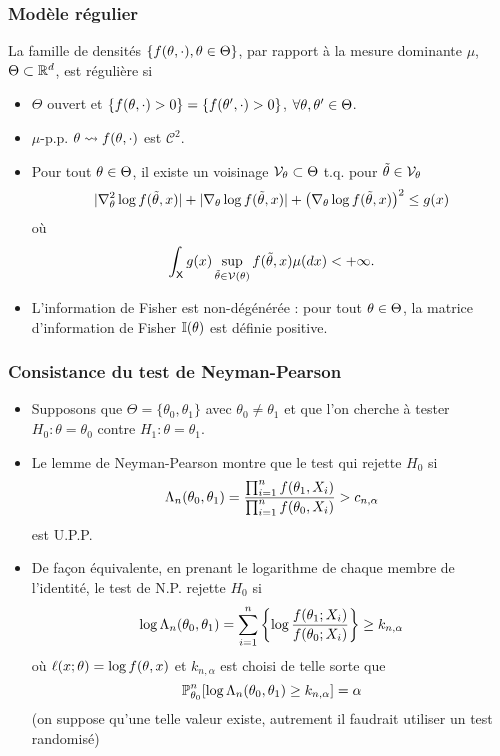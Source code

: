 \begin{frame}
\frametitle{Modèle régulier}
\begin{df} La famille de densités $\{f(\theta,\cdot),\theta \in \Theta\}$,  par rapport à la mesure dominante $\mu$, $\Theta \subset \mathbb{R}^d$, est \alert{régulière} si
\begin{itemize}
\item $\Theta$ ouvert et $\{f(\theta, \cdot)>0\}=\{f(\theta', \cdot)>0\}$, $\forall \theta, \theta' \in \Theta$.
\item $\mu$-p.p. $\theta \leadsto f(\theta,\cdot)$ est ${\mathcal C}^2$.
 \item Pour tout $\theta \in \Theta$, il existe un voisinage ${\mathcal V}_\theta \subset \Theta$ t.q. pour $\tilde{\theta} \in {\mathcal V}_\theta$
$$|\nabla_\theta^{2}\log f(\tilde{\theta},x)|+|\nabla_\theta \log f(\tilde{\theta},x)|+\big(\nabla_\theta\log f(\tilde{\theta},x)\big)^2\leq g(x)$$
où
$$\int_{\mathsf{X}}g(x)\sup_{\tilde{\theta} \in {\mathcal V}(\theta)}f(\tilde{\theta},x)\mu(dx)<+\infty.$$
\item L'information de Fisher est non-dégénérée : pour tout $\theta \in \Theta$, la matrice d'information de Fisher
$\mathbb{I}(\theta)$ est définie positive.
\end{itemize}
\end{df}
\end{frame}

\begin{frame}
\frametitle{Consistance du test de Neyman-Pearson}
\begin{itemize}
\item Supposons que $\Theta= \{\theta_0,\theta_1\}$ avec $\theta_0 \ne \theta_1$ et que l'on cherche à tester $H_0: \theta = \theta_0$ contre $H_1: \theta= \theta_1$.
\item Le lemme de Neyman-Pearson montre que le test qui rejette $H_0$ si
\[
\Lambda_n(\theta_0,\theta_1) = \frac{\prod_{i=1}^n f(\theta_1,X_i)}{\prod_{i=1}^{n} f(\theta_0,X_i)} > c_{n,\alpha}
\]
est U.P.P.
\item De façon équivalente, en prenant le logarithme de chaque membre de l'identité, le test de N.P. rejette $H_0$ si
\[
\log \Lambda_n(\theta_0,\theta_1)  = \sum_{i=1}^n \left\{ \log \frac{f(\theta_1;X_i)}{f(\theta_0;X_i)} \right\} \geq k_{n,\alpha}
\]
où $\ell(x;\theta)= \log f(\theta,x)$ et $k_{n,\alpha}$ est choisi de telle sorte que
\[
\operatorname{{\mathbb P}}_{\theta_0}^n [ \log \Lambda_n(\theta_0,\theta_1)  \geq  k_{n,\alpha}] = \alpha
\]
(on suppose qu'une telle valeur existe, autrement il faudrait utiliser un test randomisé)
\end{itemize}
\end{frame}

